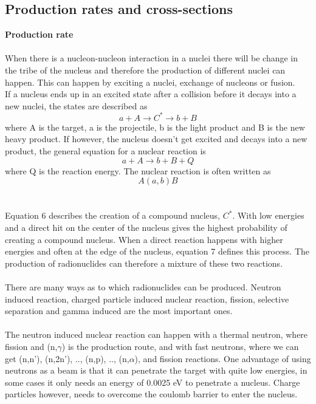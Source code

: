 \documentclass[twoside,english]{uiofysmaster/uiofysmaster}
\begin{document}
\subsection{Production rates and cross-sections}
\noindent
\textbf{Production rate}\\
\\
When there is a nucleon-nucleon interaction in a nuclei there will be change in the tribe of the nucleus and therefore the production of different nuclei can happen. This can happen by exciting a nuclei, exchange of nucleons or fusion. \cite{nuclearchem}\\
If a nucleus ends up in an excited state after a collision before it decays into a new nuclei, the states are described as \begin{equation}
    a + A \rightarrow C^* \rightarrow b + B 
\end{equation} \cite{nuclearchem}
where A is the target, a is the projectile, b is the light product and B is the new heavy product. If however, the nucleus doesn't get excited and decays into a new product, the general equation for a nuclear reaction is
\begin{equation}
    a + A \rightarrow b + B + Q 
\end{equation}
where Q is the reaction energy. The nuclear reaction is often written as $$A(a,b)B$$\\
\\
Equation 6 describes the creation of a compound nucleus, $C^*$. With low energies and a direct hit on the center of the nucleus gives the highest probability of creating a compound nucleus. When a direct reaction happens with higher energies and often at the edge of the nucleus, equation 7 defines this process\cite{Nuclear_medicine}. The production of radionuclides can therefore a mixture of these two reactions.
\\
\\
There are many ways as to which radionuclides can be produced. Neutron induced reaction, charged particle induced nuclear reaction, fission, selective separation and gamma induced are the most important ones\cite{Nuclear_medicine}.\\
\\
The neutron induced nuclear reaction can happen with a thermal neutron, where fission and (n,$\gamma$) is the production route, and with fast neutrons, where we can get (n,n'), (n,2n'), .., (n,p), .., (n,$\alpha$), and fission reactions. One advantage of using neutrons as a beam is that it can penetrate the target with quite low energies, in some cases it only needs an energy of 0.0025 eV to penetrate a nucleus\cite{Nuclear_medicine}. Charge particles however, needs to overcome the coulomb barrier to enter the nucleus. 
\end{document}
